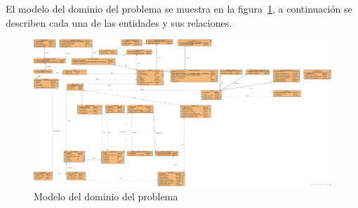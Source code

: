 
	El modelo del dominio del problema se muestra en la figura~\ref{fig:modeloDeDominio}, a continuación se describen cada una de las entidades y sus relaciones.
	
\begin{figure}[htpb!]
	\begin{center}
		\includegraphics[angle=90,width=.60\textwidth]{images/Base_Datos}
		\caption{Modelo del dominio del problema}
		\label{fig:modeloDeDominio}
	\end{center}
\end{figure}

